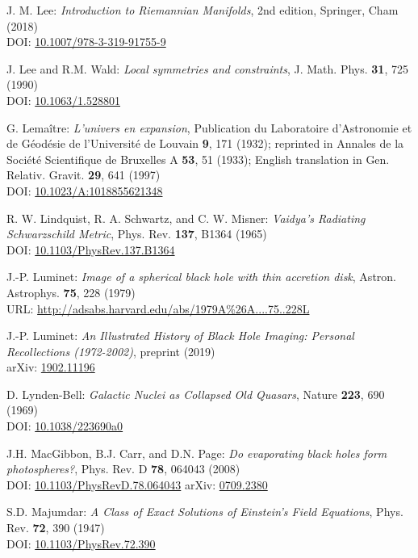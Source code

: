\begin{thebibliography}{123}
J. M. Lee:
{\em Introduction to Riemannian Manifolds}, 2nd edition,
Springer, Cham (2018)\\
DOI: \href{https://doi.org/10.1007/978-3-319-91755-9}{10.1007/978-3-319-91755-9}

J. Lee and R.M. Wald:
{\em Local symmetries and constraints},
J. Math. Phys. {\bf 31}, 725 (1990)\\
DOI: \href{https://doi.org/10.1063/1.528801}{10.1063/1.528801}

G. Lemaître: {\em L'univers en expansion},
Publication du Laboratoire d'Astronomie et de Géodésie de l'Université
de Louvain {\bf 9},  171 (1932); reprinted in
Annales de la Société Scientifique de Bruxelles A {\bf 53}, 51 (1933);
English translation in
Gen. Relativ. Gravit. {\bf 29}, 641 (1997)\\
DOI: \href{https://doi.org/10.1023/A:1018855621348}{10.1023/A:1018855621348}

R. W. Lindquist, R. A. Schwartz, and C. W. Misner:
{\em Vaidya's Radiating Schwarzschild Metric},
Phys. Rev. {\bf 137}, B1364 (1965)\\
DOI: \href{https://doi.org/10.1103/PhysRev.137.B1364}{10.1103/PhysRev.137.B1364}

J.-P. Luminet: {\em Image of a spherical black hole with thin accretion disk},
Astron. Astrophys. {\bf 75}, 228 (1979)\\
URL: \url{http://adsabs.harvard.edu/abs/1979A%26A....75..228L}

J.-P. Luminet:
{\em An Illustrated History of Black Hole Imaging: Personal Recollections (1972-2002)}, preprint (2019)\\
arXiv: \href{https://arxiv.org/abs/1902.11196}{1902.11196}

D. Lynden-Bell:
{\em Galactic Nuclei as Collapsed Old Quasars},
Nature {\bf 223}, 690 (1969)\\
DOI: \href{https://doi.org/10.1038/223690a0}{10.1038/223690a0}

J.H. MacGibbon, B.J. Carr, and D.N. Page:
{\em Do evaporating black holes form photospheres?},
Phys. Rev. D {\bf 78}, 064043 (2008)\\
DOI: \href{https://doi.org/10.1103/PhysRevD.78.064043}{10.1103/PhysRevD.78.064043}\hfill
arXiv: \href{https://arxiv.org/abs/0709.2380}{0709.2380}

S.D. Majumdar:
{\em A Class of Exact Solutions of Einstein's Field Equations},
Phys. Rev. {\bf 72}, 390 (1947)\\
DOI: \href{https://doi.org/10.1103/PhysRev.72.390}{10.1103/PhysRev.72.390}


\end{thebibliography}
